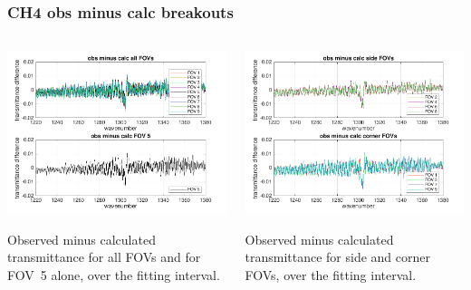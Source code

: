 \documentclass[10pt]{beamer}
\begin{document}
\begin{frame}
\frametitle{CH4 obs minus calc breakouts}
\begin{columns}[t]
\begin{column}{0.5\textwidth}
  \begin{centering}
  \includegraphics[width=\textwidth]{figures/CH4_breakout_1.png}
  \end{centering}\vspace{3mm}

Observed minus calculated transmittance for all FOVs and for FOV~5
alone, over the fitting interval.

\end{column}
\begin{column}{0.5\textwidth}  
  \begin{centering}
  \includegraphics[width=\textwidth]{figures/CH4_breakout_2.png}
  \end{centering}\vspace{3mm}

Observed minus calculated transmittance for side and corner FOVs,
over the fitting interval.

\end{column}
\end{columns}
\end{frame}
\end{document}
